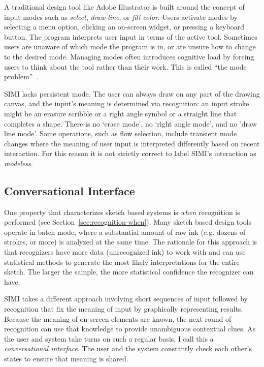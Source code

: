 A traditional design tool like Adobe Illustrator is built around the
concept of input modes such as \textit{select}, \textit{draw line}, or
\textit{fill color}. Users activate modes by selecting a menu option,
clicking an on-screen widget, or pressing a keyboard button. The
program interprets user input in terms of the active tool. Sometimes
users are unaware of which mode the program is in, or are unsure how
to change to the desired mode. Managing modes often introduces
cognitive load by forcing users to think about the tool rather than
their work. This is called ``the mode
problem''~\cite{tesler-mode-problem}.

SIMI lacks persistent mode. The user can always draw on any part of
the drawing canvas, and the input's meaning is determined via
recognition: an input stroke might be an erasure scribble or a right
angle symbol or a straight line that completes a shape. There is no
`erase mode', no `right angle mode', and no 'draw line mode'. Some
operations, such as flow selection, include transient mode changes
where the meaning of user input is interpreted differently based on
recent interaction. For this reason it is not strictly correct to
label SIMI's interaction as \textit{modeless}.

\subsection{Conversational Interface}

One property that characterizes sketch based systems is \textit{when}
recognition is performed (see
Section~\ref{sec:recognition-when}). Many sketch based design tools
operate in batch mode, where a substantial amount of raw ink
(e.g. dozens of strokes, or more) is analyzed at the same time. The
rationale for this approach is that recognizers have more data
(unrecognized ink) to work with and can use statistical methods to
generate the most likely interpretations for the entire sketch. The
larger the sample, the more statistical confidence the recognizer can
have.

SIMI takes a different approach involving short sequences of input
followed by recognition that fix the meaning of input by graphically
representing results. Because the meaning of on-screen elements are
known, the next round of recognition can use that knowledge to provide
unambiguous contextual clues. As the user and system take turns on
such a regular basis, I call this a \textit{conversational
  interface}. The user and the system constantly check each other's
states to ensure that meaning is shared.

